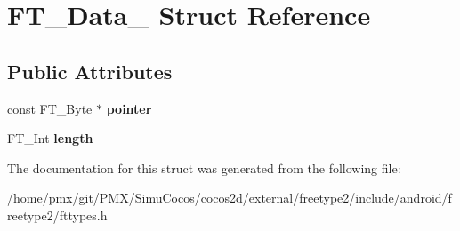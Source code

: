\hypertarget{structFT__Data__}{}\section{F\+T\+\_\+\+Data\+\_\+ Struct Reference}
\label{structFT__Data__}
\subsection*{Public Attributes}
\begin{DoxyCompactItemize}
\item 
\mbox{\label{structFT__Data___aedd70091ef8bcbed61d5615ac17fa40b}} 
const F\+T\+\_\+\+Byte $\ast$ {\bfseries pointer}
\item 
\mbox{\label{structFT__Data___af60c89dccd1852aceb0dc08675aca2fd}} 
F\+T\+\_\+\+Int {\bfseries length}
\end{DoxyCompactItemize}


The documentation for this struct was generated from the following file\+:\begin{DoxyCompactItemize}
\item 
/home/pmx/git/\+P\+M\+X/\+Simu\+Cocos/cocos2d/external/freetype2/include/android/freetype2/fttypes.\+h\end{DoxyCompactItemize}

